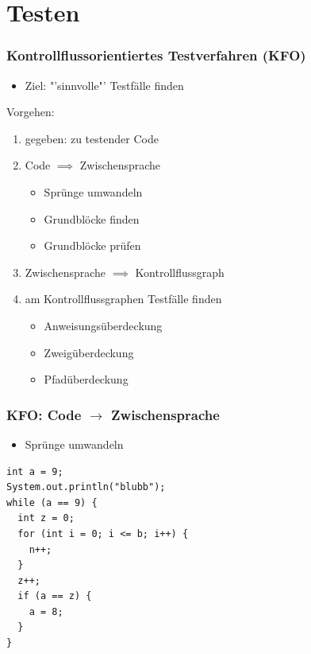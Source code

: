 \documentclass[18pt]{beamer}
\begin{document}
\section{Testen}

	\begin{frame}
		\frametitle{Kontrollflussorientiertes Testverfahren (KFO)}
		\begin{itemize}
			\item Ziel: "'sinnvolle"' Testfälle finden
		\end{itemize}
		Vorgehen:
		\begin{enumerate}
			\item gegeben: zu testender Code \pause
			\item Code $\implies$ Zwischensprache
			\begin{itemize}
				\item Sprünge umwandeln
				\item Grundblöcke finden
				\item Grundblöcke prüfen
			\end{itemize}
			\pause
			\item Zwischensprache $\implies$ Kontrollflussgraph \pause
			\item am Kontrollflussgraphen Testfälle finden \pause
			\begin{itemize}
				\item Anweisungsüberdeckung
				\item Zweigüberdeckung 
				\item Pfadüberdeckung
			\end{itemize}
		\end{enumerate}
	\end{frame}

	\begin{frame}[fragile]
		\frametitle{KFO: Code $\rightarrow$ Zwischensprache}
		\begin{itemize}
			\item Sprünge umwandeln
		\end{itemize}
	\centering
			\begin{verbatim}
int a = 9;
System.out.println("blubb");
while (a == 9) {
  int z = 0;
  for (int i = 0; i <= b; i++) {
    n++;
  }
  z++;
  if (a == z) {
    a = 8;
  }
}
			\end{verbatim}
	\end{frame}
\end{document}
